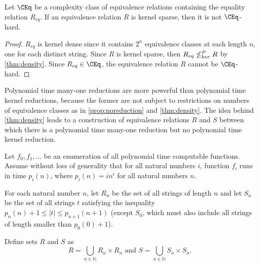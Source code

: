\begin{corollary}
  Let $\CEq$ be a complexity class of equivalence relations containing the equality relation $R_{eq}$.
  If an equivalence relation $R$ is kernel sparse, then it is not $\CEq$-hard.
\end{corollary}
\begin{proof}
  $R_{eq}$ is kernel dense since it contains $2^n$ equivalence classes at each length $n$, one for each distinct string.
  Since $R$ is kernel sparse, then $R_{eq} \nleq^{P}_{ker} R$ by \autoref{thm:density}.
  Since $R_{eq} \in \CEq$, the equivalence relation $R$ cannot be $\CEq$-hard.
\end{proof}

Polynomial time many-one reductions are more powerful than polynomial time kernel reductions, because the former are not subject to restrictions on numbers of equivalence classes as in \autoref{prop:noreduction} and \autoref{thm:density}.
The idea behind \autoref{thm:density} leads to a construction of equivalence relations $R$ and $S$ between which there is a polynomial time many-one reduction but no polynomial time kernel reduction.

\begin{construction}\label{con:rands}
  Let $f_0, f_1, \dotsc$ be an enumeration of all polynomial time computable functions.
  Assume without loss of generality  that for all natural numbers $i$, function $f_i$ runs in time $p_i(n)$, where $p_i(n) = i n^i$ for all natural numbers $n$.

  For each natural number $n$, let $R_n$ be the set of all strings of length $n$ and let $S_n$ be the set of all strings $t$ satisfying the inequality $p_n(n) + 1 \leq |t| \leq p_{n + 1}(n + 1)$ (except $S_0$, which must also include all strings of length smaller than $p_0(0) + 1$).

  Define sets $R$ and $S$ as
  \begin{equation*}
    R = \bigcup_{n \in \mathbb{N}} R_n \times R_n \text{ and } S = \bigcup_{n \in \mathbb{N}} S_n \times S_n.
  \end{equation*}
\end{construction}

